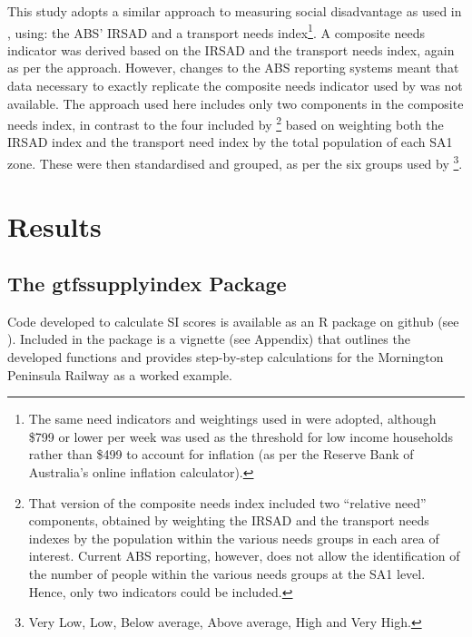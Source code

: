 \documentclass[preprint, 3p,
authoryear]{elsarticle} %
\begin{document}
This study adopts a similar approach to measuring social disadvantage as
used in \citet{currie2010identifying}, using: the ABS' IRSAD and a
transport needs index\footnote{The same need indicators and weightings
  used in \citet{currie2010identifying} were adopted, although \$799 or
  lower per week was used as the threshold for low income households
  rather than \$499 to account for inflation (as per the Reserve Bank of
  Australia's online inflation calculator).}. A composite needs
indicator was derived based on the IRSAD and the transport needs index,
again as per the \citet{currie2010identifying} approach. However,
changes to the ABS reporting systems meant that data necessary to
exactly replicate the composite needs indicator used by
\citet{currie2010identifying} was not available. The approach used here
includes only two components in the composite needs index, in contrast
to the four included by \citet{currie2010identifying}\footnote{That
  version of the composite needs index included two ``relative need''
  components, obtained by weighting the IRSAD and the transport needs
  indexes by the population within the various needs groups in each area
  of interest. Current ABS reporting, however, does not allow the
  identification of the number of people within the various needs groups
  at the SA1 level. Hence, only two indicators could be included.} based
on weighting both the IRSAD index and the transport need index by the
total population of each SA1 zone. These were then standardised and
grouped, as per the six groups used by
\citet{currie2010identifying}\footnote{Very Low, Low, Below average,
  Above average, High and Very High.}.

\hypertarget{results}{%
\section{Results}\label{results}}

\hypertarget{the-gtfssupplyindex-package}{%
\subsection{The gtfssupplyindex
Package}\label{the-gtfssupplyindex-package}}

Code developed to calculate SI scores is available as an R package on
github (see \citet{gtfssupplyindex_github}). Included in the package is
a vignette (see Appendix) that outlines the developed functions and
provides step-by-step calculations for the Mornington Peninsula Railway
as a worked example.
\end{document}
